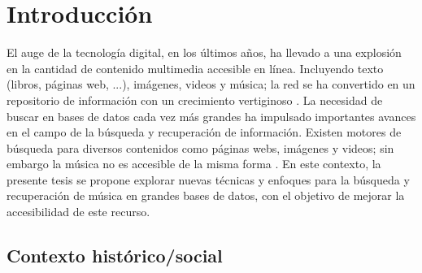 \chapter{Introducción}
\label{chapter:introduction}
El auge de la tecnología digital, en los últimos años, ha llevado a una explosión en la cantidad de contenido multimedia accesible en línea. Incluyendo texto (libros, páginas web, ...), imágenes, videos y música; la red se ha convertido en un repositorio de información con un crecimiento vertiginoso \cite{owidinternet}. La necesidad de buscar en bases de datos cada vez más grandes ha impulsado importantes avances en el campo de la búsqueda y recuperación de información. Existen motores de búsqueda para diversos contenidos como páginas webs, imágenes y videos; sin embargo la música no es accesible de la misma forma \cite{Koepke2021AudioRW}. En este contexto, la presente tesis se propone explorar nuevas técnicas y enfoques para la búsqueda y recuperación de música en grandes bases de datos, con el objetivo de mejorar la accesibilidad de este recurso. \\

\section{Contexto histórico/social} 
\label{sec:context}

